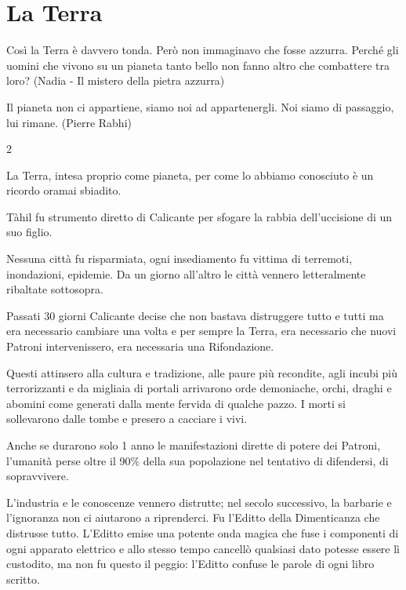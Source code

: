 \section{La Terra}

\begin{enfasi}{
Così la Terra è davvero tonda. Però non immaginavo che fosse azzurra. Perché gli uomini che vivono su un pianeta tanto bello non fanno altro che combattere tra loro? (Nadia - Il mistero della pietra azzurra)

\medskip

Il pianeta non ci appartiene, siamo noi ad appartenergli. Noi siamo di passaggio, lui rimane. (Pierre Rabhi)}\end{enfasi}

\begin{multicols}{2}

\label{terra}

La Terra, intesa proprio come pianeta, per come lo abbiamo conosciuto è un ricordo oramai sbiadito.

Tàhil fu strumento diretto di Calicante per sfogare la rabbia dell'uccisione di un suo figlio.

Nessuna città fu risparmiata, ogni insediamento fu vittima di terremoti, inondazioni, epidemie. Da un giorno all'altro le città vennero letteralmente ribaltate sottosopra.

Passati 30 giorni Calicante decise che non bastava distruggere tutto e tutti ma era necessario cambiare una volta e per sempre la Terra, era necessario che nuovi Patroni intervenissero, era necessaria una Rifondazione.

Questi attinsero alla cultura e tradizione, alle paure più recondite, agli incubi più terrorizzanti e da migliaia di portali arrivarono orde demoniache, orchi, draghi e abomini come generati dalla mente fervida di qualche pazzo. I morti si sollevarono dalle tombe e presero a cacciare i vivi.

Anche se durarono solo 1 anno le manifestazioni dirette di potere dei Patroni, l'umanità perse oltre il 90\% della sua popolazione nel tentativo di difendersi, di sopravvivere.

L'industria e le conoscenze vennero distrutte; nel secolo successivo, la barbarie e l'ignoranza non ci aiutarono a riprenderci.
Fu l'Editto della Dimenticanza che distrusse tutto. L'Editto emise una potente onda magica che fuse i componenti di ogni apparato elettrico e allo stesso tempo cancellò qualsiasi dato potesse essere lì custodito, ma non fu questo il peggio: l'Editto confuse le parole di ogni libro scritto.


\end{multicols}
